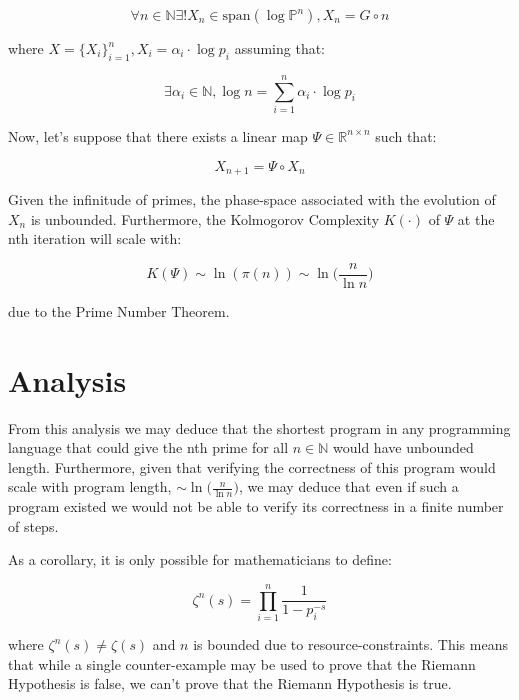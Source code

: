 \documentclass{article}
\begin{document}
\begin{equation}
\forall n \in \mathbb{N} \exists! X_n \in \text{span}(\log \mathbb{P}^n), X_n = G \circ n
\end{equation}

where $X = \{X_i\}_{i=1}^n, X_i = \alpha_i \cdot \log p_i$ assuming that:

\begin{equation}
\exists \alpha_i \in \mathbb{N}, \log n = \sum_{i=1}^n \alpha_i \cdot \log p_i
\end{equation}

Now, let's suppose that there exists a linear map $\Psi \in \mathbb{R}^{n \times n}$ such that:

\begin{equation}
X_{n+1} = \Psi \circ X_n
\end{equation}

Given the infinitude of primes, the phase-space associated with the evolution of $X_n$ is unbounded. Furthermore, the Kolmogorov Complexity $K(\cdot)$ of $\Psi$ at the nth iteration will scale with:

\begin{equation}
K(\Psi) \sim \ln(\pi(n)) \sim \ln \big(\frac{n}{\ln n}\big)
\end{equation}

due to the Prime Number Theorem.

\newpage

\section{Analysis}

From this analysis we may deduce that the shortest program in any programming language that could give the nth prime for all $n \in \mathbb{N}$ would have unbounded length. Furthermore, given that verifying the correctness of this program would scale with program length, $ \sim \ln \big(\frac{n}{\ln n}\big)$, we may deduce that even if such a program existed we would not be able to verify its correctness in a finite number of steps. 

As a corollary, it is only possible for mathematicians to define:

\begin{equation}
\zeta^n(s) = \prod_{i=1}^n \frac{1}{1-p_i^{-s}}
\end{equation}

where $\zeta^n(s) \neq \zeta(s)$ and $n$ is bounded due to resource-constraints. This means that while a single counter-example may be used to prove that the Riemann Hypothesis is false, we can’t prove that the Riemann Hypothesis is true.
\end{document}
